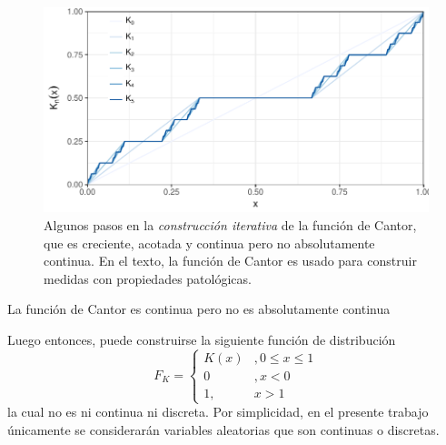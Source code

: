 \begin{figure}
\includegraphics[width=\linewidth]{./img_mas_ejemplos/cantor.pdf}
\caption[Algunos pasos en la \textit{construcción iterativa} de la función de Cantor]{Algunos pasos en la \textit{construcción iterativa} de la función de Cantor, que es creciente, acotada y continua pero no absolutamente continua. En el texto, la función de Cantor es usado para construir medidas con propiedades patológicas.}
\end{figure}


\begin{proposicion}
La función de Cantor es continua pero no es absolutamente continua
\end{proposicion}

Luego entonces, puede construirse la siguiente función de distribución
\begin{equation}
F_K = \begin{cases}
K(x) &, 0\leq x \leq 1 \\
0 &, x < 0 \\
1 ,& x > 1
\end{cases}
\end{equation}
la cual no es ni continua ni discreta. Por simplicidad, en el presente trabajo únicamente se considerarán variables aleatorias que son continuas o discretas.



